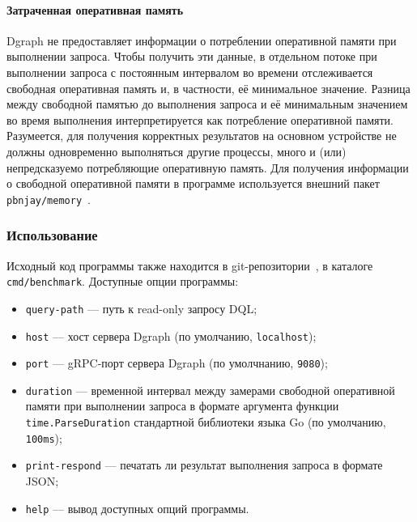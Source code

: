 \paragraph{Затраченная оперативная память}

Dgraph не предоставляет информации о потреблении оперативной памяти при выполнении запроса. Чтобы
получить эти данные, в отдельном потоке при выполнении запроса с постоянным интервалом во времени
отслеживается свободная оперативная память и, в частности, её минимальное значение. Разница между
свободной памятью до выполнения запроса и её минимальным значением во время выполнения интерпретируется
как потребление оперативной памяти. Разумеется, для получения корректных результатов на основном устройстве
не должны одновременно выполняться другие процессы, много и (или) непредсказуемо потребляющие
оперативную память. Для получения информации о свободной оперативной памяти в программе используется внешний
пакет \texttt{pbnjay/memory}~\cite{pbnjayMemory}.

\subsubsection{Использование}

Исходный код программы также находится в git-репозитории~\cite{sources}, в каталоге \texttt{cmd/benchmark}.
Доступные опции программы:
\begin{itemize}
    \item \texttt{query-path} --- путь к read-only запросу DQL;
    \item \texttt{host} --- хост сервера Dgraph (по умолчанию, \texttt{localhost});
    \item \texttt{port} --- gRPC-порт сервера Dgraph (по умолчнанию, \texttt{9080});
    \item \texttt{duration} --- временной интервал между замерами свободной оперативной памяти при
выполнении запроса в формате аргумента функции \texttt{time.ParseDuration} стандартной библиотеки
языка Go (по умолчанию, \texttt{100ms});
    \item \texttt{print-respond} --- печатать ли результат выполнения запроса в формате JSON;
    \item \texttt{help} --- вывод доступных опций программы.
\end{itemize}

